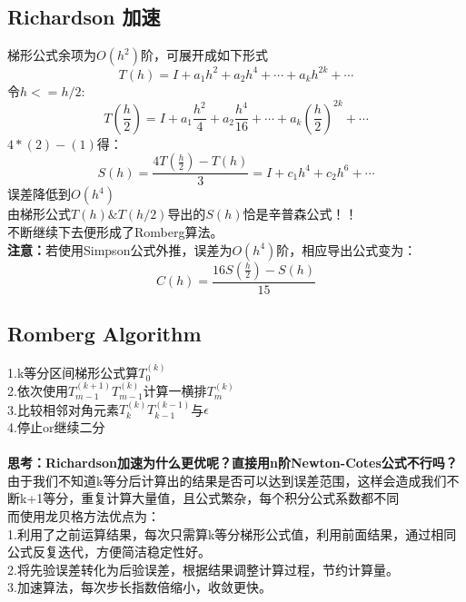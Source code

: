 \documentclass[12pt]{article}
\begin{document}
\begin{CJK*}{UTF8}{gbsn}
\begin{spacing}{1.5}
\subsection{Richardson 加速}
    梯形公式余项为$O(h^2)$阶，可展开成如下形式
    $$
        T(h) = I + a_1h^2 +a_2h^4+\cdots+ a_kh^{2k} + \cdots
    $$
    令$h <= h/2$:
    $$
        T(\frac{h}{2}) = I + a_1\frac{h^2}{4} +a_2\frac{h^4}{16}+\cdots+ a_k(\frac{h}{2})^{2k} + \cdots
    $$
    $4*(2) - (1)$得：
    $$
        S(h) = \frac{4T(\frac{h}{2})-T(h)}{3} = I + c_1h^4 + c_2h^6 + \cdots
    $$    
    误差降低到$O(h^4)$\\
    由梯形公式$T(h)\&T(h/2)$导出的$S(h)$恰是辛普森公式！！\\
    不断继续下去便形成了Romberg算法。\\
    \textbf{注意：}若使用Simpson公式外推，误差为$O(h^4)$阶，相应导出公式变为：
    $$
        C(h) = \frac{16S(\frac{h}{2})-S(h)}{15} 
    $$
\newpage
\subsection{Romberg Algorithm}
    1.k等分区间梯形公式算$T_0^{(k)}$   \\
    2.依次使用$T_{m-1}^{(k+1)} T_{m-1}^{(k)}$计算一横排$T_m^{(k)}$\\
    3.比较相邻对角元素$T_k^{(k)} T_{k-1}^{(k-1)}$与$\epsilon$\\
    4.停止or继续二分
    \\\\
    \textbf{思考：Richardson加速为什么更优呢？直接用n阶Newton-Cotes公式不行吗？}\\
    由于我们不知道k等分后计算出的结果是否可以达到误差范围，这样会造成我们不断k+1等分，重复计算大量值，且公式繁杂，每个积分公式系数都不同\\
    而使用龙贝格方法优点为：\\
    1.利用了之前运算结果，每次只需算k等分梯形公式值，利用前面结果，通过相同公式反复迭代，方便简洁稳定性好。\\
    2.将先验误差转化为后验误差，根据结果调整计算过程，节约计算量。\\
    3.加速算法，每次步长指数倍缩小，收敛更快。

\newpage

\end{spacing}
\end{CJK*}
\end{document}

